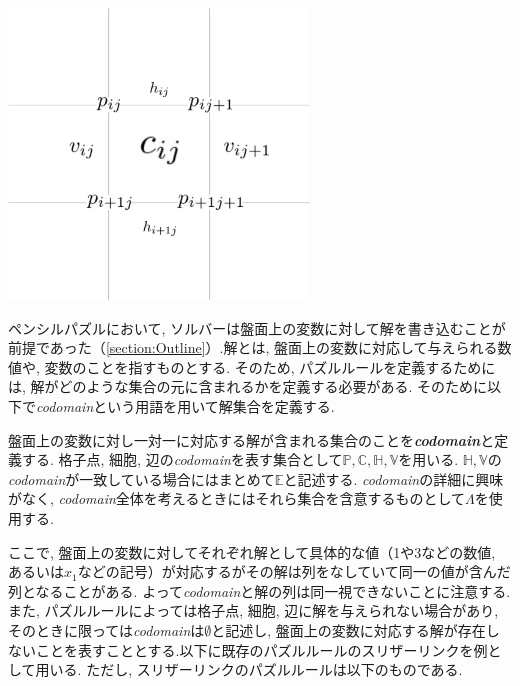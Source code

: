 \begin{clearpagefigure}
  \includegraphics[width=8cm,clip]{fig/define.png}
  \caption{}
  \label{fig:VariableAtBoard}
\end{clearpagefigure}

ペンシルパズルにおいて, ソルバーは盤面上の変数に対して解を書き込むことが前提であった（\cref{section:Outline}）.解とは, 盤面上の変数に対応して与えられる数値や, 変数のことを指すものとする.
そのため, パズルルールを定義するためには, 解がどのような集合の元に含まれるかを定義する必要がある. そのために以下で\textit{codomain}という用語を用いて解集合を定義する.

\begin{definition}\label{definition:Codomain}
  盤面上の変数に対し一対一に対応する解が含まれる集合のことを\textbf{\textit{codomain}}と定義する. 格子点, 細胞, 辺の\textit{codomain}を表す集合として$\mathbb{P},\mathbb{C},\mathbb{H},\mathbb{V}$を用いる. $\mathbb{H},\mathbb{V}$の\textit{codomain}が一致している場合にはまとめて$\mathbb{E}$と記述する. \textit{codomain}の詳細に興味がなく, \textit{codomain}全体を考えるときにはそれら集合を含意するものとして$\Lambda$を使用する.
\end{definition}

ここで, 盤面上の変数に対してそれぞれ解として具体的な値（1や3などの数値, あるいは$x_1$などの記号）が対応するがその解は列をなしていて同一の値が含んだ列となることがある.
よって\textit{codomain}と解の列は同一視できないことに注意する. また, パズルルールによっては格子点, 細胞, 辺に解を与えられない場合があり, そのときに限っては\textit{codomain}は$\emptyset$と記述し, 盤面上の変数に対応する解が存在しないことを表すこととする.以下に既存のパズルルールのスリザーリンクを例として用いる. ただし, スリザーリンクのパズルルールは以下のものである. \cite{web:SlitherLink}

